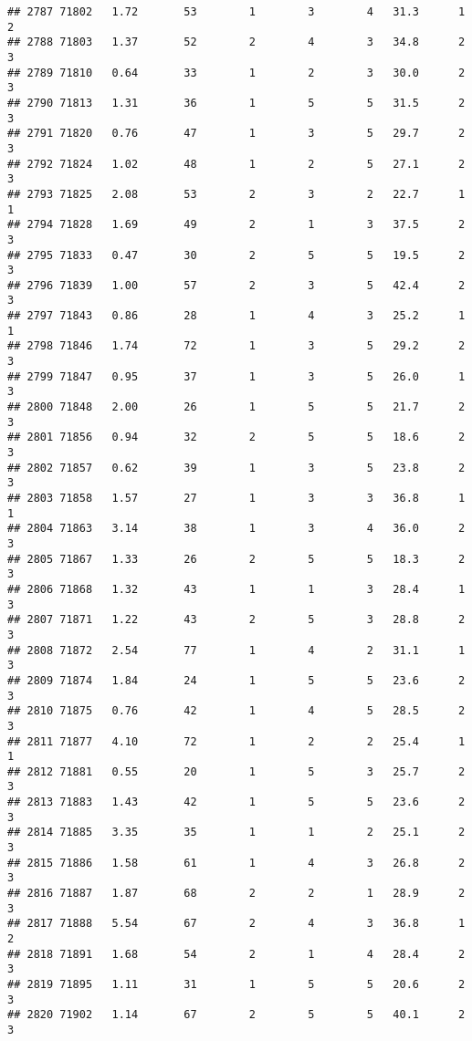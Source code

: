 \documentclass[
]{article}
\begin{document}
\begin{verbatim}
## 2787 71802   1.72       53        1        3        4   31.3      1      2
## 2788 71803   1.37       52        2        4        3   34.8      2      3
## 2789 71810   0.64       33        1        2        3   30.0      2      3
## 2790 71813   1.31       36        1        5        5   31.5      2      3
## 2791 71820   0.76       47        1        3        5   29.7      2      3
## 2792 71824   1.02       48        1        2        5   27.1      2      3
## 2793 71825   2.08       53        2        3        2   22.7      1      1
## 2794 71828   1.69       49        2        1        3   37.5      2      3
## 2795 71833   0.47       30        2        5        5   19.5      2      3
## 2796 71839   1.00       57        2        3        5   42.4      2      3
## 2797 71843   0.86       28        1        4        3   25.2      1      1
## 2798 71846   1.74       72        1        3        5   29.2      2      3
## 2799 71847   0.95       37        1        3        5   26.0      1      3
## 2800 71848   2.00       26        1        5        5   21.7      2      3
## 2801 71856   0.94       32        2        5        5   18.6      2      3
## 2802 71857   0.62       39        1        3        5   23.8      2      3
## 2803 71858   1.57       27        1        3        3   36.8      1      1
## 2804 71863   3.14       38        1        3        4   36.0      2      3
## 2805 71867   1.33       26        2        5        5   18.3      2      3
## 2806 71868   1.32       43        1        1        3   28.4      1      3
## 2807 71871   1.22       43        2        5        3   28.8      2      3
## 2808 71872   2.54       77        1        4        2   31.1      1      3
## 2809 71874   1.84       24        1        5        5   23.6      2      3
## 2810 71875   0.76       42        1        4        5   28.5      2      3
## 2811 71877   4.10       72        1        2        2   25.4      1      1
## 2812 71881   0.55       20        1        5        3   25.7      2      3
## 2813 71883   1.43       42        1        5        5   23.6      2      3
## 2814 71885   3.35       35        1        1        2   25.1      2      3
## 2815 71886   1.58       61        1        4        3   26.8      2      3
## 2816 71887   1.87       68        2        2        1   28.9      2      3
## 2817 71888   5.54       67        2        4        3   36.8      1      2
## 2818 71891   1.68       54        2        1        4   28.4      2      3
## 2819 71895   1.11       31        1        5        5   20.6      2      3
## 2820 71902   1.14       67        2        5        5   40.1      2      3

\end{verbatim}
\end{document}
